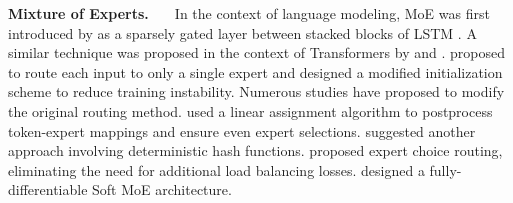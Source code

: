 \textbf{Mixture of Experts. \ \ } 
In the context of language modeling, MoE was first introduced by \cite{shazeer2017outrageously} as a sparsely gated layer between stacked blocks of LSTM \citep{hochreiter1997long}. A similar technique was proposed in the context of Transformers by \cite{shazeer2018meshtensorflow} and \cite{lepikhin2020gshard}. \cite{fedus2022switch} proposed to route each input to only a single expert and designed a modified initialization scheme to reduce training instability.
Numerous studies have proposed to modify the original routing method. \cite{lewis2021base} used a linear assignment algorithm to postprocess token-expert mappings and ensure even expert selections. \cite{roller2021hash} suggested another approach involving deterministic hash functions. \cite{zhou2022mixtureofexperts} proposed expert choice routing, eliminating the need for additional load balancing losses. \cite{puigcerver2023sparse} designed a fully-differentiable Soft MoE architecture.


